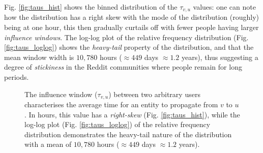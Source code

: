 \documentclass[10pt,journal,compsoc]{IEEEtran}
\begin{document}
Fig. \ref{fig:taus_hist} shows the binned distribution of the $\tau_{v,u}$ values: one can note how the distribution has a right skew with the mode of the distribution (roughly) being at one hour, this then gradually curtails off with fewer people having larger \emph{influence windows}.
The log-log plot of the relative frequency distribution (Fig. \ref{fig:taus_loglog}) shows the \emph{heavy-tail} property of the distribution, and that the mean window width is $10,780$ hours ($\approx 449$ days $\approx 1.2$ years), thus suggesting a degree of \emph{stickiness} in the Reddit communities where people remain for long periods.


\begin{figure}[ht!]
  \begin{center}
  \end{center}    
  \caption{The influence window ($\tau_{v,u}$) between two arbitrary users characterises the average time for an entity to propagate from $v$ to $u$. In hours, this value has a \emph{right-skew} (Fig. \ref{fig:taus_hist}), while the log-log plot (Fig. \ref{fig:taus_loglog}) of the relative frequency distribution demonstrates the heavy-tail nature of the distribution with a mean of $10,780$ hours ($\approx 449$ days $\approx 1.2$ years).}
  \label{fig:taus}
\end{figure}
\end{document}
